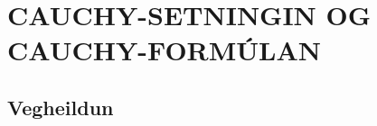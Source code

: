 \newenvironment{se}{\begin{setning+}\sl}{\hfill$\square$\end{setning+}\rm}
\newenvironment{sex}{\begin{setning+}\sl}{\hfill$\blacksquare$\end{setning+}\rm}
\newenvironment{sk}{\begin{skilgreining+}\rm}{\hfill$\square$\end{skilgreining+}\rm}
\newenvironment{sesk}{\begin{setningogskilgreining+}\rm}{\hfill$\square$\end{setningogskilgreining+}\rm}
\newenvironment{hs}{\begin{hjalparsetning+}\sl}{\hfill$\square$\end{hjalparsetning+}\rm}
\newenvironment{fs}{\begin{fylgisetning+}\sl}{\hfill$\square$\end{fylgisetning+}\rm}
\newenvironment{sy}{\begin{synidaemi+}\rm}{\hfill$\square$\end{synidaemi+}\rm}
\newenvironment{fo}{\begin{forrit+}\rm}{\hfill\end{forrit+}\rm}
\newenvironment{so}{\medbreak\noindent{\it Sönnun:}\rm}{\hfill$\blacksquare$\rm}
\newenvironment{sotx}[1]{\medbreak\noindent{\it #1:}\rm}{\hfill$\blacksquare$\rm}
\newcommand{\aefing}{\section{Æfingardæmi} \setcounter{daemateljari}{1}}
\newcommand{\daemi}{
{\medskip\noindent{\bf \thedaemateljari.}}
\addtocounter{daemateljari}{1}
}

\def\svar#1{\smallskip\noindent{\bf #1.} \ }
\def\lausn#1{\smallskip\noindent{\bf #1.} \ }
\def\ugrein#1{\medbreak\noindent{\bf #1.} }
\newcommand{\samantekt}{\noindent{\bf Samantekt.} }

\chapter {CAUCHY-SETNINGIN OG CAUCHY-FORMÚLAN}
 

\section
{Vegheildun}

